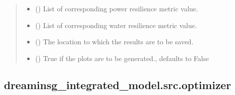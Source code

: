 \documentclass[letterpaper,10pt,english]{sphinxmanual}
\begin{document}
\begin{fulllineitems}
\begin{fulllineitems}
\begin{quote}
\begin{description}
\begin{itemize}
\item {} 
\sphinxAtStartPar
{} () \textendash{} List of corresponding power resilience metric value.

\item {} 
\sphinxAtStartPar
{} () \textendash{} List of corresponding water resilience metric value.

\item {} 
\sphinxAtStartPar
{} () \textendash{} The location to which the results are to be saved.

\item {} 
\sphinxAtStartPar
{} (\sphinxstyleliteralemphasis{\sphinxupquote{, }}) \textendash{} True if the plots are to be generated., defaults to False

\end{itemize}

\end{description}\end{quote}

\end{fulllineitems}


\end{fulllineitems}



\subsection{dreaminsg\_integrated\_model.src.optimizer}
\label{\detokenize{apidoc:module-dreaminsg_integrated_model.src.optimizer}}\label{\detokenize{apidoc:dreaminsg-integrated-model-src-optimizer}}
\end{document}
